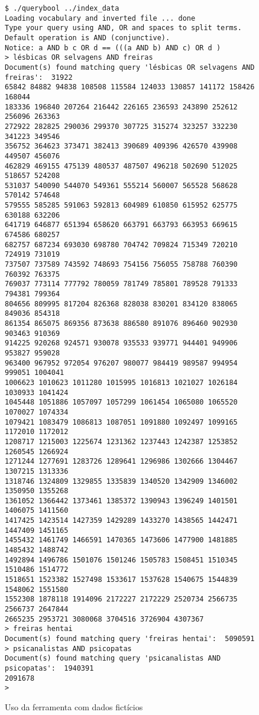 \documentclass[10pt,twocolumn]{article}
\begin{document}
\begin{figure*}
\begin{center}
\begin{verbatim}
$ ./querybool ../index_data
Loading vocabulary and inverted file ... done
Type your query using AND, OR and spaces to split terms.
Default operation is AND (conjunctive).
Notice: a AND b c OR d == (((a AND b) AND c) OR d )
> lésbicas OR selvagens AND freiras
Document(s) found matching query 'lésbicas OR selvagens AND freiras':  31922
65842 84882 94838 108508 115584 124033 130857 141172 158426 168044
183336 196840 207264 216442 226165 236593 243890 252612 256096 263363
272922 282825 290036 299370 307725 315274 323257 332230 341223 349546
356752 364623 373471 382413 390689 409396 426570 439908 449507 456076
462829 469155 475139 480537 487507 496218 502690 512025 518657 524208
531037 540090 544070 549361 555214 560007 565528 568628 570142 574648
579555 585285 591063 592813 604989 610850 615952 625775 630188 632206
641719 646877 651394 658620 663791 663793 663953 669615 674586 680257
682757 687234 693030 698780 704742 709824 715349 720210 724919 731019
737507 737589 743592 748693 754156 756055 758788 760390 760392 763375
769037 773114 777792 780059 781749 785801 789528 791333 794381 799364
804656 809995 817204 826368 828038 830201 834120 838065 849036 854318
861354 865075 869356 873638 886580 891076 896460 902930 903463 910369
914225 920268 924571 930078 935533 939771 944401 949906 953827 959028
963400 967952 972054 976207 980077 984419 989587 994954 999051 1004041
1006623 1010623 1011280 1015995 1016813 1021027 1026184 1030933 1041424
1045448 1051886 1057097 1057299 1061454 1065080 1065520 1070027 1074334
1079421 1083479 1086813 1087051 1091880 1092497 1099165 1172010 1172012
1208717 1215003 1225674 1231362 1237443 1242387 1253852 1260545 1266924
1271244 1277691 1283726 1289641 1296986 1302666 1304467 1307215 1313336
1318746 1324809 1329855 1335839 1340520 1342909 1346002 1350950 1355268
1361052 1366442 1373461 1385372 1390943 1396249 1401501 1406075 1411560
1417425 1423514 1427359 1429289 1433270 1438565 1442471 1447409 1451165
1455432 1461749 1466591 1470365 1473606 1477900 1481885 1485432 1488742
1492894 1496786 1501076 1501246 1505783 1508451 1510345 1510486 1514772
1518651 1523382 1527498 1533617 1537628 1540675 1544839 1548062 1551580
1552308 1878118 1914096 2172227 2172229 2520734 2566735 2566737 2647844
2665235 2953721 3080068 3704516 3726904 4307367
> freiras hentai
Document(s) found matching query 'freiras hentai':  5090591
> psicanalistas AND psicopatas
Document(s) found matching query 'psicanalistas AND psicopatas':  1940391
2091678
>
\end{verbatim}
\caption{Uso da ferramenta com dados fictícios}
\end{center}
\end{figure*}
\end{document}
